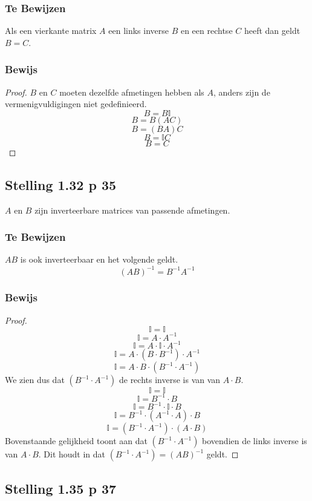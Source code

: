 \documentclass[lineaire_algebra_oplossingen.tex]{subfiles}
\begin{document}
\subsubsection*{Te Bewijzen}
Als een vierkante matrix $A$ een links inverse $B$ en een rechtse $C$ heeft dan geldt $B=C$.

\subsubsection*{Bewijs}
\begin{proof}
$B$ en $C$ moeten dezelfde afmetingen hebben als $A$, anders zijn de vermenigvuldigingen niet gedefinieerd.
\[B = B\mathbb{I}\]
\[B = B (AC)\]
\[B = (BA)C\]
\[B = \mathbb{I}C\]
\[B = C\]
\end{proof}


\subsection{Stelling 1.32 p 35}
\label{1.32}
$A$ en $B$ zijn inverteerbare matrices van passende afmetingen.
\subsubsection*{Te Bewijzen}
$AB$ is ook inverteerbaar en het volgende geldt.
\[
(AB)^{-1} = B^{-1}A^{-1}
\]

\subsubsection*{Bewijs}
\begin{proof}
$$\mathbb{I} = \mathbb{I}$$
$$\mathbb{I} = A\cdot A^{-1}$$
$$\mathbb{I} = A\cdot \mathbb{I} \cdot A^{-1}$$
$$\mathbb{I} = A\cdot (B\cdot B^{-1}) \cdot A^{-1}$$
$$\mathbb{I} = A\cdot B\cdot (B^{-1} \cdot A^{-1})$$
We zien dus dat $(B^{-1} \cdot A^{-1})$ de rechts inverse is van van $A \cdot B$. 
$$\mathbb{I} = \mathbb{I}$$
$$\mathbb{I} = B^{-1}\cdot B$$
$$\mathbb{I} = B^{-1}\cdot \mathbb{I}\cdot B$$
$$\mathbb{I} = B^{-1}\cdot (A^{-1}\cdot A) \cdot B$$
$$\mathbb{I} = (B^{-1} \cdot  A^{-1})\cdot (A\cdot B)$$
Bovenstaande gelijkheid toont aan dat $(B^{-1} \cdot A^{-1})$ bovendien de links inverse is van $A \cdot B$. 
Dit houdt in dat $(B^{-1} \cdot A^{-1}) = (AB)^{-1}$ geldt.
\end{proof}


\subsection{Stelling 1.35 p 37}
\label{1.35}
\end{document}
